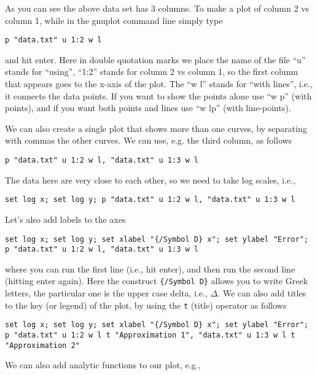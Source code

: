 \documentclass[aps,showpacs,prd,notitlepage,preprintnumbers,amsmath,amssymb,letterpaper]{revtex4}
\begin{document}
As you can see the above data set has 3 columns. To make a plot of column 2
vs column 1, while in the gnuplot command line simply type

\begin{verbatim}
p "data.txt" u 1:2 w l 
\end{verbatim}
%
and hit enter. Here in double quotation marks we place the name of the
file ``u'' stands for ``using'', ``1:2'' stands for column 2 vs column
1, so the first column that appears goes to the x-axis of the
plot. The ``w l'' stands for ``with lines'', i.e., it connects the
data points.  If you want to show the points alone use ``w p'' (with
points), and if you want both points and lines use ``w lp'' (with
line-points).

We can also create a single plot that shows more than one curves, by
separating with commas the other curves. We can use, e.g. the third
column, as follows

\begin{verbatim}
p "data.txt" u 1:2 w l, "data.txt" u 1:3 w l
\end{verbatim}

The data here are very close to each other, so we need to take log
scales, i.e.,

\begin{verbatim}
set log x; set log y; p "data.txt" u 1:2 w l, "data.txt" u 1:3 w l
\end{verbatim}

Let's also add labels to the axes

\begin{verbatim}
set log x; set log y; set xlabel "{/Symbol D} x"; set ylabel "Error";  
p "data.txt" u 1:2 w l, "data.txt" u 1:3 w l
\end{verbatim}
%
where you can run the first line (i.e., hit enter), and then run the second line (hitting
enter again). Here the construct {\tt \{/Symbol D\}} allows you to write Greek
letters, the particular one is the upper case delta, i.e., $\Delta$. We can also add
titles to the key (or legend) of the plot, by using the {\tt t} (title) operator as follows

\begin{verbatim}
set log x; set log y; set xlabel "{/Symbol D} x"; set ylabel "Error";  
p "data.txt" u 1:2 w l t "Approximation 1", "data.txt" u 1:3 w l t "Approximation 2"
\end{verbatim}

We can also add analytic functions to our plot, e.g.,
\end{document}
